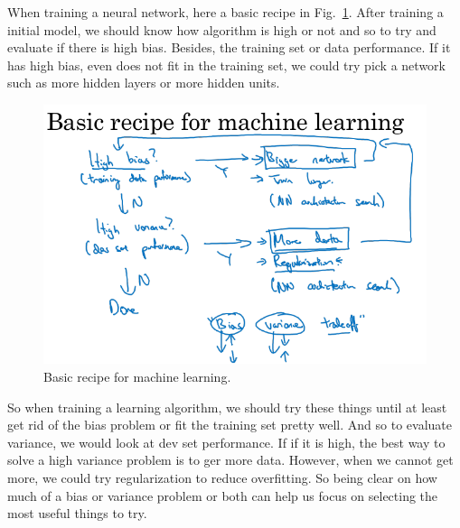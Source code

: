\documentclass[a4paper]{article}
\begin{document}
When training a neural network, here a basic recipe in Fig.~\ref{p8}. After training a initial model, we should know how algorithm is high or not and so to try and evaluate if there is high bias. Besides, the training set or data performance. If it has  high bias, even does not fit in the training set, we could try pick a network such as more hidden layers or more hidden units. 
\begin{figure}
	\begin{center}
		\includegraphics[scale=0.3]{figures/9.png}
	\end{center}
	\caption{Basic recipe for machine learning.}
	\label{p8}
\end{figure}

So when training a learning algorithm, we should try these things until at least get rid of the bias problem or fit the training set pretty well. And so to evaluate variance, we would look at dev set performance. If if it is high, the best way to solve a high variance problem is to ger more data. However, when we cannot get more, we could try regularization to reduce overfitting. So being clear on how much of a bias or variance problem or both can help us focus on selecting the most useful things to try.
\end{document}
